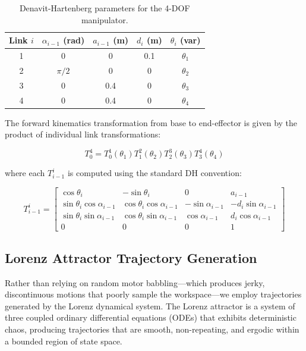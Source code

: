 ﻿\documentclass[12pt,a4paper,oneside]{report}
\begin{document}
\begin{table}[H]
\centering
\caption{Denavit-Hartenberg parameters for the 4-DOF manipulator.}
\label{tab:dh_parameters}
\begin{tabular}{ccccc}
\toprule
Link $i$ & $\alpha_{i-1}$ (rad) & $a_{i-1}$ (m) & $d_i$ (m) & $\theta_i$ (var) \\
\midrule
1 & 0 & 0 & 0.1 & $\theta_1$ \\
2 & $\pi/2$ & 0 & 0 & $\theta_2$ \\
3 & 0 & 0.4 & 0 & $\theta_3$ \\
4 & 0 & 0.4 & 0 & $\theta_4$ \\
\bottomrule
\end{tabular}
\end{table}

The forward kinematics transformation from base to end-effector is given by the product of individual link transformations:

\begin{equation}
T_{0}^{4} = T_{0}^{1}(\theta_1) T_{1}^{2}(\theta_2) T_{2}^{3}(\theta_3) T_{3}^{4}(\theta_4)
\end{equation}

where each $T_{i-1}^{i}$ is computed using the standard DH convention:

\begin{equation}
T_{i-1}^{i} = 
\begin{bmatrix}
\cos\theta_i & -\sin\theta_i & 0 & a_{i-1} \\
\sin\theta_i \cos\alpha_{i-1} & \cos\theta_i \cos\alpha_{i-1} & -\sin\alpha_{i-1} & -d_i \sin\alpha_{i-1} \\
\sin\theta_i \sin\alpha_{i-1} & \cos\theta_i \sin\alpha_{i-1} & \cos\alpha_{i-1} & d_i \cos\alpha_{i-1} \\
0 & 0 & 0 & 1
\end{bmatrix}
\end{equation}

\subsection{Lorenz Attractor Trajectory Generation}

Rather than relying on random motor babbling---which produces jerky, discontinuous motions that poorly sample the workspace---we employ trajectories generated by the Lorenz dynamical system. The Lorenz attractor is a system of three coupled ordinary differential equations (ODEs) that exhibits deterministic chaos, producing trajectories that are smooth, non-repeating, and ergodic within a bounded region of state space.
\end{document}
